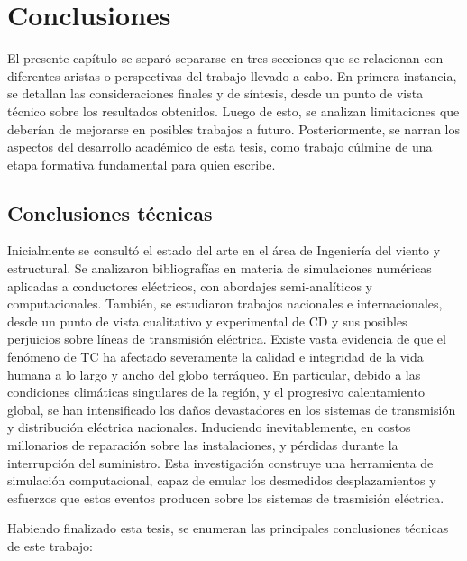 \chapter{Conclusiones}\label{Cap:Conlcusiones}
\linenumbers

El presente capítulo se separó separarse en tres secciones que se relacionan con diferentes aristas o perspectivas del trabajo llevado a cabo. En primera instancia, se detallan las consideraciones finales y de síntesis, desde un punto de vista técnico sobre los resultados obtenidos. Luego de esto, se analizan limitaciones que deberían de mejorarse en posibles trabajos a futuro.  Posteriormente, se narran los aspectos del desarrollo académico de esta tesis, como trabajo cúlmine de una etapa formativa fundamental para quien escribe.  

\section{Conclusiones técnicas}
Inicialmente se consultó el estado del arte en el área de Ingeniería del viento y estructural. Se analizaron bibliografías en materia de simulaciones numéricas aplicadas a conductores eléctricos, con abordajes semi-analíticos y computacionales. También, se estudiaron trabajos nacionales e internacionales, desde un punto de vista cualitativo y experimental de CD y sus posibles perjuicios sobre líneas de transmisión eléctrica. Existe vasta evidencia de que el fenómeno de \gls{TC} ha afectado severamente la calidad e integridad de la vida humana a lo largo y ancho del globo terráqueo. En particular, debido a las condiciones climáticas singulares de la región, y el progresivo calentamiento global, se han intensificado los daños devastadores en los sistemas de transmisión y distribución eléctrica nacionales. Induciendo inevitablemente, en costos millonarios de reparación sobre las instalaciones, y pérdidas durante la interrupción del suministro. Esta investigación construye una herramienta de simulación computacional, capaz de emular los desmedidos desplazamientos y esfuerzos que estos eventos producen sobre los sistemas de trasmisión eléctrica. 

Habiendo finalizado esta tesis, se enumeran las principales conclusiones técnicas de este trabajo:


